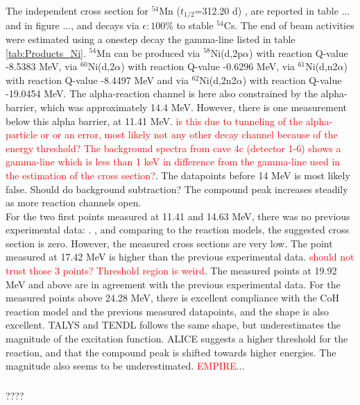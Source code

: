 \subsubsection{}
The independent cross section for $^{54}$Mn ($t_{1/2}$=312.20 d) \cite{Dong2014}, are reported in table ... and in figure ..., and decays via $\epsilon:100\%$ to stable $^{54}$Cs. The end of beam activities were estimated using a onestep decay the gamma-line listed in table \ref{tab:Products_Ni}. $^{54}$Mn can be produced via $^{58}$Ni(d,2p$\alpha$) with reaction Q-value -8.5383 MeV, via $^{60}$Ni(d,2$\alpha$) with reaction Q-value -0.6296 MeV, via $^{61}$Ni(d,n2$\alpha$) with reaction Q-value -8.4497 MeV and via $^{62}$Ni(d,2n2$\alpha$) with reaction Q-value -19.0454 MeV. The alpha-reaction channel is here also constrained by the alpha-barrier, which was approximately 14.4 MeV. However, there is one measurement below this alpha barrier, at 11.41 MeV. \textcolor{red}{is this due to tunneling of the alpha-particle or or an error, most likely not any other decay channel because of the energy threshold? The background spectra from cave 4c (detector 1-6) shows a gamma-line which is less than 1 keV in difference from the gamma-line used in the estimation of the cross section?}. The datapoints before 14 MeV is most likely false. Should do background subtraction? The compound peak increases steadily as more reaction channels open. \\ 
\noindent 
For the two first points measured at 11.41 and 14.63 MeV, there was no previous experimental data: \cite{Hermanne2013, Takacs2007, Usman2016,  Amjed2013}. , and comparing to the reaction models, the suggested cross section is zero. However, the measured cross sections are very low. The point measured at 17.42 MeV is higher than the previous experimental data. \textcolor{red}{should not trust those 3 points? Threshold region is weird}. The measured points at 19.92 MeV and above are in agreement with the previous experimental data. For the measured points above 24.28 MeV, there is excellent compliance with the CoH reaction model and the previous measured datapoints, and the shape is also excellent. TALYS and TENDL follows the same shape, but underestimates the magnitude of the excitation function. ALICE suggests a higher threshold for the reaction, and that the compound peak is shifted towards higher energies. The magnitude also seems to be underestimated. \textcolor{red}{EMPIRE}...

\subsubsection{}
???? 

